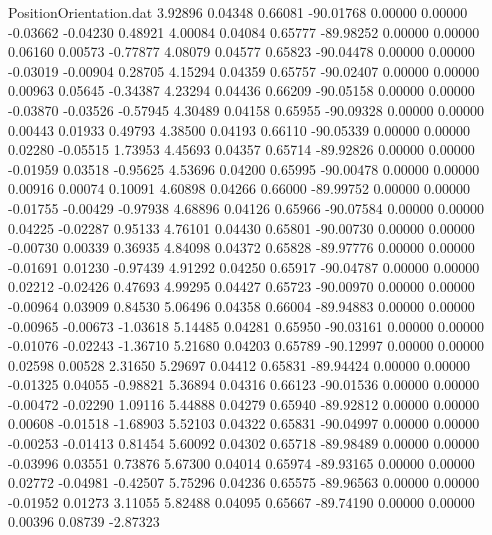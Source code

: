 \begin{filecontents}{PositionOrientation.dat}
   3.92896    0.04348    0.66081   -90.01768    0.00000    0.00000   -0.03662   -0.04230    0.48921
   4.00084    0.04084    0.65777   -89.98252    0.00000    0.00000    0.06160    0.00573   -0.77877
   4.08079    0.04577    0.65823   -90.04478    0.00000    0.00000   -0.03019   -0.00904    0.28705
   4.15294    0.04359    0.65757   -90.02407    0.00000    0.00000    0.00963    0.05645   -0.34387
   4.23294    0.04436    0.66209   -90.05158    0.00000    0.00000   -0.03870   -0.03526   -0.57945
   4.30489    0.04158    0.65955   -90.09328    0.00000    0.00000    0.00443    0.01933    0.49793
   4.38500    0.04193    0.66110   -90.05339    0.00000    0.00000    0.02280   -0.05515    1.73953
   4.45693    0.04357    0.65714   -89.92826    0.00000    0.00000   -0.01959    0.03518   -0.95625
   4.53696    0.04200    0.65995   -90.00478    0.00000    0.00000    0.00916    0.00074    0.10091
   4.60898    0.04266    0.66000   -89.99752    0.00000    0.00000   -0.01755   -0.00429   -0.97938
   4.68896    0.04126    0.65966   -90.07584    0.00000    0.00000    0.04225   -0.02287    0.95133
   4.76101    0.04430    0.65801   -90.00730    0.00000    0.00000   -0.00730    0.00339    0.36935
   4.84098    0.04372    0.65828   -89.97776    0.00000    0.00000   -0.01691    0.01230   -0.97439
   4.91292    0.04250    0.65917   -90.04787    0.00000    0.00000    0.02212   -0.02426    0.47693
   4.99295    0.04427    0.65723   -90.00970    0.00000    0.00000   -0.00964    0.03909    0.84530
   5.06496    0.04358    0.66004   -89.94883    0.00000    0.00000   -0.00965   -0.00673   -1.03618
   5.14485    0.04281    0.65950   -90.03161    0.00000    0.00000   -0.01076   -0.02243   -1.36710
   5.21680    0.04203    0.65789   -90.12997    0.00000    0.00000    0.02598    0.00528    2.31650
   5.29697    0.04412    0.65831   -89.94424    0.00000    0.00000   -0.01325    0.04055   -0.98821
   5.36894    0.04316    0.66123   -90.01536    0.00000    0.00000   -0.00472   -0.02290    1.09116
   5.44888    0.04279    0.65940   -89.92812    0.00000    0.00000    0.00608   -0.01518   -1.68903
   5.52103    0.04322    0.65831   -90.04997    0.00000    0.00000   -0.00253   -0.01413    0.81454
   5.60092    0.04302    0.65718   -89.98489    0.00000    0.00000   -0.03996    0.03551    0.73876
   5.67300    0.04014    0.65974   -89.93165    0.00000    0.00000    0.02772   -0.04981   -0.42507
   5.75296    0.04236    0.65575   -89.96563    0.00000    0.00000   -0.01952    0.01273    3.11055
   5.82488    0.04095    0.65667   -89.74190    0.00000    0.00000    0.00396    0.08739   -2.87323

\end{filecontents}
